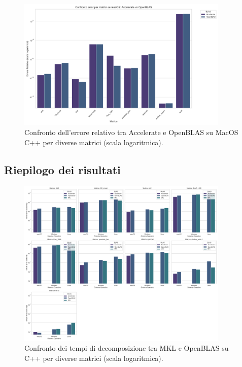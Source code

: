 \begin{figure}[H]
    \centering
    \includegraphics[width=0.9\textwidth]{images/C++/macOs/error_comparison}
    \caption{Confronto dell'errore relativo tra Accelerate e OpenBLAS su MacOS C++ per diverse matrici (scala logaritmica).}
    \label{fig:macos-error-comparison}
\end{figure}

\subsection{Riepilogo dei risultati}

\begin{figure}[H]
    \centering
    \includegraphics[width=0.9\textwidth]{images/C++/decompTime_facet_grid}
    \caption{Confronto dei tempi di decomposizione tra MKL e OpenBLAS su C++ per diverse matrici (scala logaritmica).}
    \label{fig:decomp-comparison}
\end{figure}

